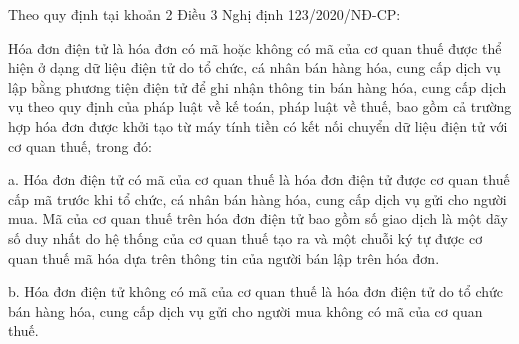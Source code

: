 
  Theo quy định tại khoản 2 Điều 3 Nghị định 123/2020/NĐ-CP:

Hóa đơn điện tử là hóa đơn có mã hoặc không có mã của cơ quan thuế được thể hiện ở dạng dữ liệu điện tử do tổ chức, cá nhân bán hàng hóa, cung cấp dịch vụ lập bằng phương tiện điện tử để ghi nhận thông tin bán hàng hóa, cung cấp dịch vụ theo quy định của pháp luật về kế toán, pháp luật về thuế, bao gồm cả trường hợp hóa đơn được khởi tạo từ máy tính tiền có kết nối chuyển dữ liệu điện tử với cơ quan thuế, trong đó:

a. Hóa đơn điện tử có mã của cơ quan thuế là hóa đơn điện tử được cơ quan thuế cấp mã trước khi tổ chức, cá nhân bán hàng hóa, cung cấp dịch vụ gửi cho người mua. Mã của cơ quan thuế trên hóa đơn điện tử bao gồm số giao dịch là một dãy số duy nhất do hệ thống của cơ quan thuế tạo ra và một chuỗi ký tự được cơ quan thuế mã hóa dựa trên thông tin của người bán lập trên hóa đơn.

b. Hóa đơn điện tử không có mã của cơ quan thuế là hóa đơn điện tử do tổ chức bán hàng hóa, cung cấp dịch vụ gửi cho người mua không có mã của cơ quan thuế.